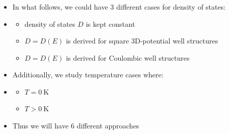 \begin{frame}
\frametitle{\texorpdfstring{\culine[\sectiontitleulinecolor]{\sectiontitle}}{\sectiontitle} }

\begin{itemize}
	\item In what follows, we could have 3 different cases for density of states:
\item[] \begin{itemize}
	\item density of states $D$ is kept constant 
\item $D=D(E)$ is derived for square 3D-potential well structures 
\item $D=D(E)$ is derived for Coulombic well structures 

\end{itemize}

\item Additionally, we study temperature cases where:
\item[] \begin{itemize}
	\item $T=0 \mathrm{~K}$
	\item $T>0 \mathrm{~K}$
	\end{itemize}
	
	\item Thus we will have 6 different approaches

\end{itemize}

\endofslide 
\end{frame}

